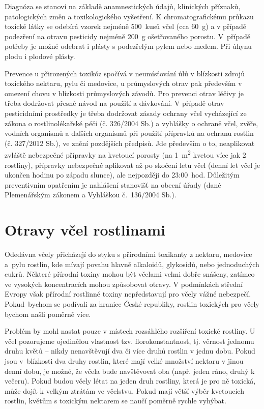 \documentclass[openany, oneside, a4paper, 12pt, final]{memoir}
\begin{document}
Diagnóza se stanoví na základě anamnestických údajů, klinických příznaků, patologických změn a toxikologického vyšetření. K chromatografickému průkazu toxické látky se odebírá vzorek nejméně 500~kusů včel (cca 60~g) a v případě podezření na otravu pesticidy nejméně 200~g ošetřovaného porostu. \cite{vyhlaska327} V~případě potřeby je možné odebrat i plásty s podezřelým pylem nebo medem. Při úhynu plodu i plodové plásty. 

Prevence u přirozených toxikóz spočívá v neumísťování úlů v blízkosti zdrojů toxického nektaru, pylu či medovice, u průmyslových otrav pak především v omezení chovu v blízkosti průmyslových závodů. Pro prevenci otrav léčivy je třeba dodržovat přesně návod na použití a dávkování. V případě otrav pesticidními prostředky je třeba dodržovat zásady ochrany včel vycházející ze zákona o rostlinolékařské péči (č. 326/2004 Sb.) a vyhlášky o ochraně včel, zvěře, vodních organismů a dalších organismů při použití přípravků na ochranu rostlin (č. 327/2012 Sb.), ve znění pozdějších předpisů. Jde především o to, neaplikovat zvláště nebezpečné přípravky na kvetoucí porosty (na 1~m\textsuperscript{2} kvetou více jak 2 rostliny), přípravky nebezpečné aplikovat až po skočení letu včel (denní let včel je ukončen hodinu po západu slunce), ale nejpozději do 23:00~hod. Důležitým preventivním opatřením je nahlášení stanovišť na obecní úřady (dané Plemenářským zákonem a Vyhláškou č.~136/2004 Sb.). \cite{Multimedpomucka, vyhlaska327} 

\chapter{Otravy včel rostlinami}

Odedávna včely přicházejí do styku s přírodními toxikanty z nektaru, medovice a~pylu rostlin, kde mívají povahu hlavně alkaloidů, glykosidů, nebo jednoduchých cukrů. Některé přírodní toxiny mohou být včelami velmi dobře snášeny, zatímco ve vysokých koncentracích mohou způsobovat otravy. V podmínkách střední Evropy však přírodní rostlinné toxiny nepředstavují pro včely vážné nebezpečí. Pokud~bychom se podívali za hranice České republiky, rostlin toxických pro včely bychom našli poměrně více. 
~\cite{svobodovaveterinarni,johnson2015honey}

Problém by mohl nastat pouze v místech rozsáhlého rozšíření toxické rostliny. U včel pozorujeme ojedinělou vlastnost tzv. florokonstantnost, tj. věrnost jednomu druhu květů -- nikdy nenavštěvují dva či více druhů rostlin v jednu dobu. Pokud jsou v~blízkosti dva druhy rostlin, které mají velké množství nektaru v jinou denní dobu, je možné, že včela bude navštěvovat oba (např. jeden ráno, druhý k večeru). \cite{Pridal} Pokud budou včely létat na jeden druh rostliny, která je pro ně toxická, může dojít k velkým ztrátám ve včelstvu. Pokud mají větší výběr kvetoucích rostlin, květům s toxickým nektarem se naučí poměrně rychle vyhýbat. \cite{pain2015sweet}
\end{document}
